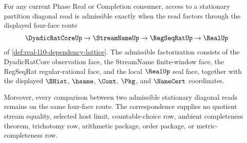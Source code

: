 \begin{theorem}
\label{thm:real-l10-stationary-diagonal-route-exhaustion}
For any current Phase Real or Completion consumer, access to a stationary partition diagonal read is admissible exactly when the read factors through the displayed four-face route
$$
\DyadicRatCoreUp \to \StreamNameUp \to \RegSeqRatUp \to \RealUp
$$
of \autoref{def:real-l10-dependency-lattice}. The admissible factorization consists of the DyadicRatCore observation face, the StreamName finite-window face, the RegSeqRat regular-rational face, and the local $\RealUp$ seal face, together with the displayed $\BHist$, $\hsame$, $\Cont$, $\Pkg$, and $\NameCert$ coordinates.

Moreover, every comparison between two admissible stationary diagonal reads remains on the same four-face route. The correspondence supplies no quotient stream equality, selected host limit, countable-choice row, ambient completeness theorem, trichotomy row, arithmetic package, order package, or metric-completeness row.
\end{theorem}
